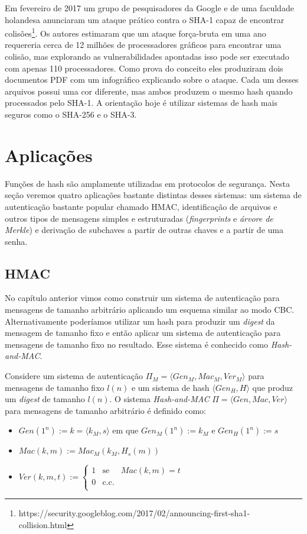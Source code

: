 Em fevereiro de 2017 um grupo de pesquisadores da Google e de uma faculdade holandesa anunciaram um ataque prático contra o SHA-1 capaz de encontrar colisões\footnote{https://security.googleblog.com/2017/02/announcing-first-sha1-collision.html}.
Os autores estimaram que um ataque força-bruta em uma ano requereria cerca de 12 milhões de processadores gráficos para encontrar uma colisão, mas explorando as vulnerabilidades apontadas isso pode ser executado com apenas 110 processadores.
Como prova do conceito eles produziram dois documentos PDF com um infográfico explicando sobre o ataque.
Cada um desses arquivos possui uma cor diferente, mas ambos produzem o mesmo hash quando processados pelo SHA-1.
A orientação hoje é utilizar sistemas de hash mais seguros como o SHA-256 e o SHA-3.

\section{Aplicações}
\label{sec:aplicacoes}

Funções de hash são amplamente utilizadas em protocolos de segurança.
Nesta seção veremos quatro aplicações bastante distintas desses sistemas: um sistema de autenticação bastante popular chamado HMAC, identificação de arquivos e outros tipos de mensagens simples e estruturadas  ({\em fingerprints} e {\em árvore de Merkle}) e derivação de subchaves a partir de outras chaves e a partir de uma senha.

\subsection{HMAC}
\label{sec:hmac}

No capítulo anterior vimos como construir um sistema de autenticação para mensagens de tamanho arbitrário aplicando um esquema similar ao modo CBC.
Alternativamente poderíamos utilizar um hash para produzir um {\em digest} da mensagem de tamanho fixo e então aplicar um sistema de autenticação para mensagens de tamanho fixo no resultado.
Esse sistema é conhecido como {\em Hash-and-MAC}.

Considere um sistema de autenticação $\Pi_M = \langle Gen_M, Mac_M, Ver_M \rangle$ para mensagens de tamanho fixo $l(n)$ e um sistema de hash $\langle Gen_H, H \rangle$ que produz um {\em digest} de tamanho $l(n)$.
O sistema {\em Hash-and-MAC} $\Pi = \langle Gen, Mac, Ver \rangle$ para mensagens de tamanho arbitrário é definido como:
\begin{itemize}
\item $Gen(1^n) := k = \langle k_M, s \rangle$ em que $Gen_M(1^n) := k_M$ e $Gen_H(1^n) := s$
\item $Mac(k, m) := Mac_M(k_M, H_s(m))$
\item $Ver(k, m, t) := \left\{
    \begin{array}{lcl}
      1 & \textrm{se} & Mac(k,m) = t\\
      0 & \textrm{c.c.} &\\
    \end{array}
    \right.$ 
\end{itemize}


